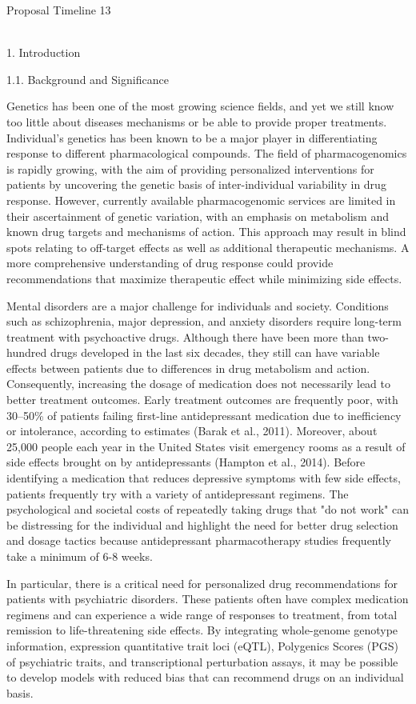 \documentclass[
]{article}
\begin{document}
Proposal Timeline{ }13

\textbf{}~\\

1. Introduction

1.1. Background and Significance

Genetics has been one of the most growing science fields, and yet we
still know too little about diseases mechanisms or be able to provide
proper treatments. Individual's genetics has been known to be a major
player in differentiating response to different pharmacological
compounds. The field of pharmacogenomics is rapidly growing, with the
aim of providing personalized interventions for patients by uncovering
the genetic basis of inter-individual variability in drug response.
However, currently available pharmacogenomic services are limited in
their ascertainment of genetic variation, with an emphasis on metabolism
and known drug targets and mechanisms of action. This approach may
result in blind spots relating to off-target effects as well as
additional therapeutic mechanisms. A more comprehensive understanding of
drug response could provide recommendations that maximize therapeutic
effect while minimizing side effects.

Mental disorders are a major challenge for individuals and society.
Conditions such as schizophrenia, major depression, and anxiety
disorders require long-term treatment with psychoactive drugs. Although
there have been more than two-hundred drugs developed in the last six
decades, they still can have variable effects between patients due to
differences in drug metabolism and action. Consequently, increasing the
dosage of medication does not necessarily lead to better treatment
outcomes. Early treatment outcomes are frequently poor, with 30--50\% of
patients failing first-line antidepressant medication due to
inefficiency or intolerance, according to estimates (Barak et al.,
2011). Moreover, about 25,000 people each year in the United States
visit emergency rooms as a result of side effects brought on by
antidepressants (Hampton et al., 2014). Before identifying a medication
that reduces depressive symptoms with few side effects, patients
frequently try with a variety of antidepressant regimens. The
psychological and societal costs of repeatedly taking drugs that "do not
work" can be distressing for the individual and highlight the need for
better drug selection and dosage tactics because antidepressant
pharmacotherapy studies frequently take a minimum of 6-8 weeks.

In particular, there is a critical need for personalized drug
recommendations for patients with psychiatric disorders. These patients
often have complex medication regimens and can experience a wide range
of responses to treatment, from total remission to life-threatening side
effects. By integrating whole-genome genotype information, expression
quantitative trait loci (eQTL), Polygenics Scores (PGS) of psychiatric
traits, and transcriptional perturbation assays, it may be possible to
develop models with reduced bias that can recommend drugs on an
individual basis.
\end{document}
